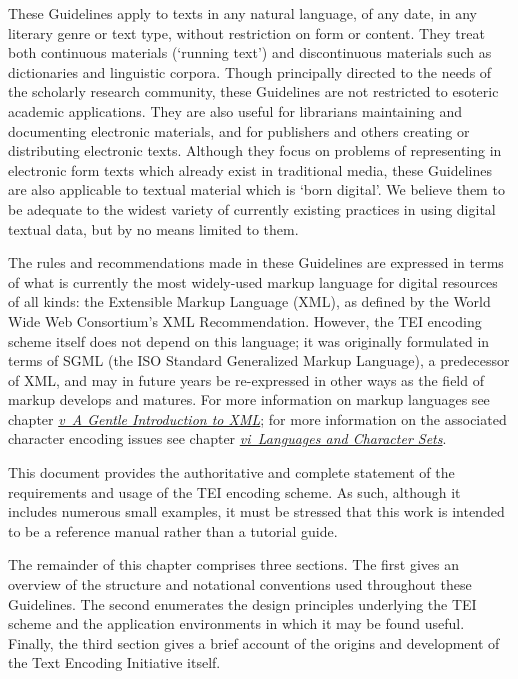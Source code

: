 These Guidelines apply to texts in any natural language, of any date, in any literary genre or text type, without restriction on form or content. They treat both continuous materials (‘running text’) and discontinuous materials such as dictionaries and linguistic corpora. Though principally directed to the needs of the scholarly research community, these Guidelines are not restricted to esoteric academic applications. They are also useful for librarians maintaining and documenting electronic materials, and for publishers and others creating or distributing electronic texts. Although they focus on problems of representing in electronic form texts which already exist in traditional media, these Guidelines are also applicable to textual material which is ‘born digital’. We believe them to be adequate to the widest variety of currently existing practices in using digital textual data, but by no means limited to them.\par
The rules and recommendations made in these Guidelines are expressed in terms of what is currently the most widely-used markup language for digital resources of all kinds: the Extensible Markup Language (XML), as defined by the World Wide Web Consortium's XML Recommendation. However, the TEI encoding scheme itself does not depend on this language; it was originally formulated in terms of SGML (the ISO Standard Generalized Markup Language), a predecessor of XML, and may in future years be re-expressed in other ways as the field of markup develops and matures. For more information on markup languages see chapter \textit{\hyperref[SG]{v\ A Gentle Introduction to XML}}; for more information on the associated character encoding issues see chapter \textit{\hyperref[CH]{vi\ Languages and Character Sets}}.\par
This document provides the authoritative and complete statement of the requirements and usage of the TEI encoding scheme. As such, although it includes numerous small examples, it must be stressed that this work is intended to be a reference manual rather than a tutorial guide. \par
The remainder of this chapter comprises three sections. The first gives an overview of the structure and notational conventions used throughout these Guidelines. The second enumerates the design principles underlying the TEI scheme and the application environments in which it may be found useful. Finally, the third section gives a brief account of the origins and development of the Text Encoding Initiative itself.
